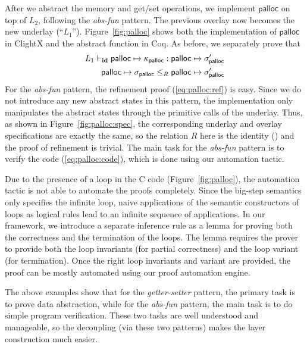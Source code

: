After we abstract the memory and get/set operations,
we implement $\textsf{palloc}$ on top of $L_2$,
following the {\it abs-fun} pattern.
The previous overlay now becomes the new underlay (``$L_1$'').
Figure~\ref{fig:palloc} shows both the implementation of
$\textsf{palloc}$ in ClightX and the abstract function in Coq.
As before, we separately prove that
\begin{align}
\ltyp{L_1}{\id}%
	{\textsf{palloc} \mapsto \kappa_\textsf{palloc}}%
	{\textsf{palloc} \mapsto \sigma'_\textsf{palloc}}
	\label{eq:palloc:code}
\\
\textsf{palloc} \mapsto \sigma_\textsf{palloc}\lpath{R}
\textsf{palloc} \mapsto \sigma'_\textsf{palloc}
\label{eq:palloc:ref}
\end{align}%
For the {\it abs-fun} pattern, the refinement proof 
(\ref{eq:palloc:ref}) is easy.
Since we do not introduce any new abstract states in this pattern,
the implementation only manipulates the abstract states through the
primitive calls of the underlay. Thus, as shown in 
Figure~\ref{fig:palloc:spec},
the corresponding underlay and overlay specifications are exactly the same,
so the relation $R$ here is the identity (\id) and 
the proof of refinement is trivial.
The main task for the {\it abs-fun}
pattern is to verify the code
(\ref{eq:palloc:code}), which is done using our automation tactic. 


Due to the presence of a loop in the C code (\cf Figure~\ref{fig:palloc}), 
the automation tactic is not able to automate the proofs completely.
Since the big-step semantics only specifies the infinite loop,
naive applications of the semantic constructors of loops as
logical rules lead to an infinite sequence of applications.
In our framework, we introduce a separate inference rule as a
lemma for proving both the correctness and the termination of the loops.
The lemma requires the prover to provide both the loop invariants
(for partial correctness) and the loop variant (for termination).
Once the right loop invariants and variant are provided, the proof
can be mostly automated using our proof automation engine.


The above examples show that for the {\it getter-setter} pattern, the
primary task is to prove data abstraction, while for the {\it abs-fun}
pattern, the main task is to do simple program verification.  These
two tasks are well understood and manageable, so the decoupling (via
these two patterns) makes the layer construction much easier. 

